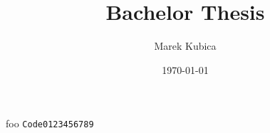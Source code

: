\documentclass{scrartcl}
\author{Marek Kubica}
\title{Bachelor Thesis}
\date{\today}
\begin{document}
\maketitle
foo
\texttt{Code0123456789}



\end{document}
